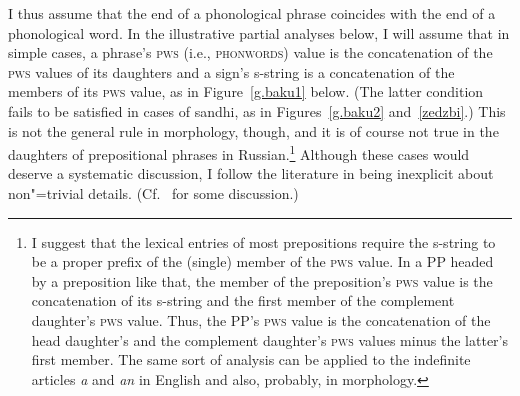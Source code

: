 \documentclass[output=paper]{langsci/langscibook}
\begin{document}
I thus assume that the end of a phonological phrase coincides with the end
of a phonological word. In the illustrative partial analyses below, I will
assume that in simple cases, a phrase's \textsc{pws} (i.e., \textsc{phonwords})
value is the concatenation of the \textsc{pws} values of its daughters and a
sign's s-string is a concatenation of the members of its \textsc{pws} value,
as in Figure~\ref{g.baku1} below.  (The latter condition fails to be
satisfied in cases of sandhi, as in Figures~\ref{g.baku2} and~\ref{zedzbi}.)  This is not the general rule in morphology, though, and
it is of course not true in the daughters of prepositional phrases in
Russian.\footnote{%
	I suggest that the lexical entries of most prepositions
  require the s-string to be a proper prefix of the (single) member of the
  \textsc{pws} value. In a PP headed by a preposition like that, the member of
  the preposition's \textsc{pws} value is the concatenation of its s-string
  and the first member of the complement daughter's \textsc{pws} value. Thus,
  the PP's \textsc{pws} value is the concatenation of the head daughter's and
  the complement daughter's \textsc{pws} values minus the latter's first
  member.  The same sort of analysis can be applied to the indefinite
  articles \textit{a}\/ and \textit{an}\/ in English and also, probably, in
  morphology.%
}
Although these cases would deserve a systematic discussion,
I follow the literature in being inexplicit about non"=trivial details.
(Cf.\ \citealt{ink:zec:95} for some
discussion.)
\end{document}

